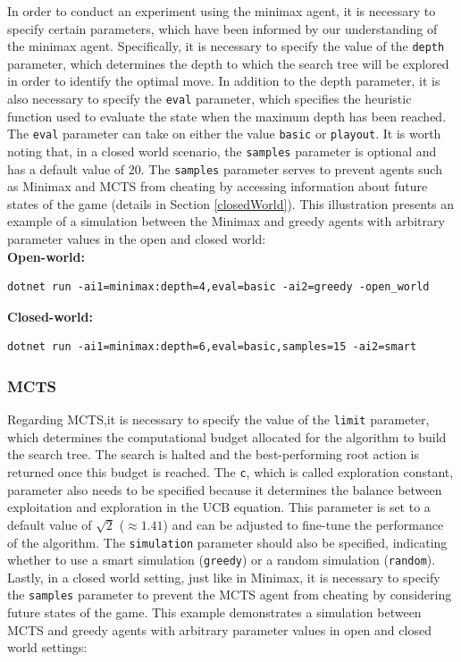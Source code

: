 In order to conduct an experiment using the minimax agent, it is necessary to specify certain parameters, which have been informed by our understanding of the minimax agent. Specifically, it is necessary to specify the value of the \texttt{depth} parameter, which determines the depth to which the search tree will be explored in order to identify the optimal move. In addition to the depth parameter, it is also necessary to specify the \texttt{eval} parameter, which specifies the heuristic function used to evaluate the state when the maximum depth has been reached. The \texttt{eval} parameter can take on either the value \texttt{basic} or \texttt{playout}. It is worth noting that, in a closed world scenario, the \texttt{samples} parameter is optional and has a default value of 20. The \texttt{samples} parameter serves to prevent agents such as Minimax and MCTS from cheating by accessing information about future states of the game (details in Section \ref{closedWorld}). This illustration presents an example of a simulation between the Minimax and greedy agents with arbitrary parameter values in the open and closed world:\\

\textbf{Open-world: }
\begin{lstlisting}
dotnet run -ai1=minimax:depth=4,eval=basic -ai2=greedy -open_world
\end{lstlisting}

\textbf{Closed-world: }
\begin{lstlisting}
dotnet run -ai1=minimax:depth=6,eval=basic,samples=15 -ai2=smart
\end{lstlisting}

\subsubsection{MCTS}

Regarding MCTS,it is necessary to specify the value of the \texttt{limit} parameter, which determines the computational budget allocated for the algorithm to build the search tree. The search is halted and the best-performing root action is returned once this budget is reached. The \texttt{c}, which is called exploration constant, parameter also needs to be specified because it determines the balance between exploitation and exploration in the UCB equation. This parameter is set to a default value of  $\sqrt{2}$ ($\approx 1.41$) and can be adjusted to fine-tune the performance of the algorithm. The \texttt{simulation} parameter should also be specified, indicating whether to use a smart simulation (\texttt{greedy}) or a random simulation (\texttt{random}). Lastly, in a closed world setting, just like in Minimax, it is necessary to specify the \texttt{samples} parameter to prevent the MCTS agent from cheating by considering future states of the game. This example demonstrates a simulation between MCTS and greedy agents with arbitrary parameter values in open and closed world settings: \\

